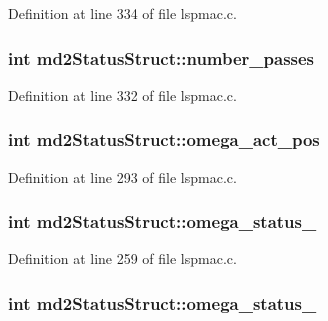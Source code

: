 Definition at line 334 of file lspmac.\-c.

\hypertarget{structmd2StatusStruct_ab3da523bad7b82c1d27780caa24a8b92}{
\subsubsection[{number\-\_\-passes}]{\setlength{\rightskip}{0pt plus 5cm}int md2\-Status\-Struct\-::number\-\_\-passes}}\label{structmd2StatusStruct_ab3da523bad7b82c1d27780caa24a8b92}


Definition at line 332 of file lspmac.\-c.

\hypertarget{structmd2StatusStruct_a6ce303bec89082cae1e9b1fddf6b6c10}{
\subsubsection[{omega\-\_\-act\-\_\-pos}]{\setlength{\rightskip}{0pt plus 5cm}int md2\-Status\-Struct\-::omega\-\_\-act\-\_\-pos}}\label{structmd2StatusStruct_a6ce303bec89082cae1e9b1fddf6b6c10}


Definition at line 293 of file lspmac.\-c.

\hypertarget{structmd2StatusStruct_af6cf3cd65b9ef205685a0d970f168907}{
\subsubsection[{omega\-\_\-status\-\_\-1}]{\setlength{\rightskip}{0pt plus 5cm}int md2\-Status\-Struct\-::omega\-\_\-status\-\_}}\label{structmd2StatusStruct_af6cf3cd65b9ef205685a0d970f168907}


Definition at line 259 of file lspmac.\-c.

\hypertarget{structmd2StatusStruct_a8577c9df7b663b548b2759ac3db721cd}{
\subsubsection[{omega\-\_\-status\-\_\-2}]{\setlength{\rightskip}{0pt plus 5cm}int md2\-Status\-Struct\-::omega\-\_\-status\-\_}}\label{structmd2StatusStruct_a8577c9df7b663b548b2759ac3db721cd}


